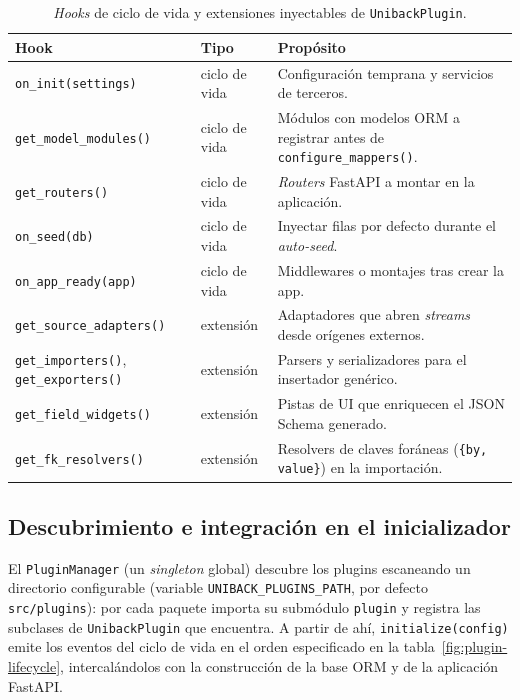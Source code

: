 \begin{table}[!htbp]
\caption{\emph{Hooks} de ciclo de vida y extensiones inyectables de \texttt{UnibackPlugin}.}
\label{tab:plugin-hooks}
\centering
\begin{tabular}{|l|l|p{6.3cm}|}
\hline
\textbf{Hook} & \textbf{Tipo} & \textbf{Propósito} \\ \hline
\texttt{on\_init(settings)} & ciclo de vida & Configuración temprana y
servicios de terceros. \\ \hline
\texttt{get\_model\_modules()} & ciclo de vida & Módulos con modelos ORM a
registrar antes de \texttt{configure\_mappers()}. \\ \hline
\texttt{get\_routers()} & ciclo de vida & \emph{Routers} FastAPI a montar en la
aplicación. \\ \hline
\texttt{on\_seed(db)} & ciclo de vida & Inyectar filas por defecto durante el
\emph{auto-seed}. \\ \hline
\texttt{on\_app\_ready(app)} & ciclo de vida & Middlewares o montajes tras crear
la app. \\ \hline
\texttt{get\_source\_adapters()} & extensión & Adaptadores que abren
\emph{streams} desde orígenes externos. \\ \hline
\texttt{get\_importers()}, \texttt{get\_exporters()} & extensión & Parsers y
serializadores para el insertador genérico. \\ \hline
\texttt{get\_field\_widgets()} & extensión & Pistas de UI que enriquecen el
JSON Schema generado. \\ \hline
\texttt{get\_fk\_resolvers()} & extensión & Resolvers de claves foráneas
(\texttt{\{by, value\}}) en la importación. \\ \hline
\end{tabular}
\end{table}

\subsection{Descubrimiento e integración en el inicializador}
El \texttt{PluginManager} (un \emph{singleton} global) descubre los plugins
escaneando un directorio configurable (variable \texttt{UNIBACK\_PLUGINS\_PATH},
por defecto \texttt{src/plugins}): por cada paquete importa su submódulo
\texttt{plugin} y registra las subclases de \texttt{UnibackPlugin} que encuentra.
A partir de ahí, \texttt{initialize(config)} emite los eventos del ciclo de vida
en el orden especificado en la tabla~\ref{fig:plugin-lifecycle}, intercalándolos con 
la construcción de la base ORM y de la
aplicación FastAPI.

